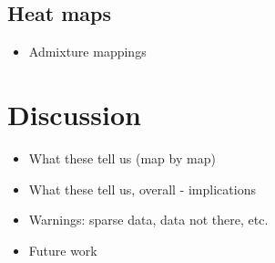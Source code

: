 \documentclass[11pt]{article}
\begin{document}
\subsection{Heat maps}
\begin{itemize}
\item Admixture mappings
\end{itemize}

\section{Discussion}
\begin{itemize}
\item What these tell us (map by map)
\item What these tell us, overall - implications
\item Warnings: sparse data, data not there, etc. 
\item Future work
\end{itemize}



\end{document}
